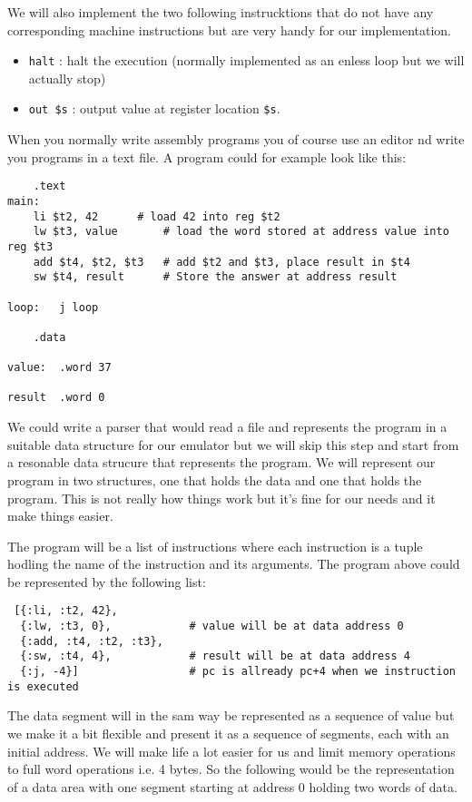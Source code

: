 \documentclass[a4paper,11pt]{article}
\begin{document}
We will also implement the two following instrucktions that do not
have any corresponding machine instructions but are very handy for our
implementation.

\begin{itemize}
\item {\tt halt} : halt the execution (normally implemented as an enless loop but we will actually stop)
\item {\tt out \$s} : output value at register location {\tt \$s}.
\end{itemize}

When you normally write assembly programs you of course use an editor
nd write you programs in a text file. A program could for example
look like this:


\begin{verbatim}
	.text 	
main:
	li $t2, 42		# load 42 into reg $t2 
	lw $t3, value		# load the word stored at address value into reg $t3
	add $t4, $t2, $t3	# add $t2 and $t3, place result in $t4
	sw $t4, result		# Store the answer at address result

loop:   j loop

	.data

value:	.word 37

result 	.word 0
\end{verbatim}

We could write a parser that would read a file and represents the
program in a suitable data structure for our emulator but we will skip
this step and start from a resonable data strucure that represents the
program. We will represent our program in two structures, one that
holds the data and one that holds the program. This is not really how
things work but it's fine for our needs and it make things easier.

The program will be a list of instructions where each instruction is a
tuple hodling the name of the instruction and its arguments. The
program above could be represented by the following list:

\begin{verbatim}
 [{:li, :t2, 42},
  {:lw, :t3, 0},            # value will be at data address 0
  {:add, :t4, :t2, :t3},
  {:sw, :t4, 4},            # result will be at data address 4
  {:j, -4}]                 # pc is allready pc+4 when we instruction is executed
\end{verbatim}

The data segment will in the sam way be represented as a sequence of
value but we make it a bit flexible and present it as a sequence of
segments, each with an initial address. We will make life a lot easier
for us and limit memory operations to full word operations i.e. 4
bytes. So the following would be the representation of a data area
with one segment starting at address 0 holding two words of data.
\end{document}
